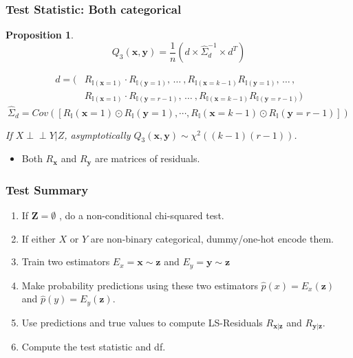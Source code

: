 \documentclass{beamer}
\def\ci{\perp\!\!\!\!\!\perp}
\newtheorem{proposition}{Proposition}
\begin{document}
\begin{frame}
	\frametitle{Test Statistic: Both categorical}
	\begin{proposition}

	$$ Q_3(\bm{x}, \bm{y}) = \frac{1}{n} (d \times \hat{\Sigma}_d^{-1} \times d^T) $$

	\begin{equation*}
		\begin{split}
		d = (&R_{\mathbb{I}(\mathbf{x}=1)} \cdot R_{\mathbb{I}(\mathbf{y}=1)}, \, \ldots \ ,
				R_{\mathbb{I}(\mathbf{x}=k-1)} R_{\mathbb{I}(\mathbf{y}=1)}, \, \ldots \, , \\
		     &R_{\mathbb{I}(\mathbf{x}=1)} \cdot R_{\mathbb{I}(\mathbf{y}=r-1)}, \, \ldots \ ,
				R_{\mathbb{I}(\mathbf{x}=k-1)} R_{\mathbb{I}(\mathbf{y}=r-1)}) 
		\end{split}
	\end{equation*}
	\begin{equation*}
		\hat{\Sigma}_d = Cov([R_\mathbb{I}(\mathbf{x}=1) \odot R_\mathbb{I}(\mathbf{y}=1), \cdots, R_\mathbb{I}(\mathbf{x}=k-1) \odot R_\mathbb{I}(\mathbf{y}=r-1)])
	\end{equation*}

	If $ X \ci Y | Z $, asymptotically $ Q_3(\bm{x}, \bm{y}) \sim \chi^2((k-1)(r-1)) $.
	\end{proposition}
	\begin{center}
		\begin{itemize}
			\item Both $ R_{\bm{x}} $ and $ R_{\bm{y}} $ are matrices of residuals.
		\end{itemize}
	\end{center}

\end{frame}

\begin{frame}
	\frametitle{Test Summary}
	\begin{enumerate}
		\setlength\itemsep{1em}
		\item If $\mathbf{Z} = \emptyset $ , do a non-conditional chi-squared test.
		\item If either $ X $ or $ Y $ are non-binary categorical,
			dummy/one-hot encode them.
		\item Train two estimators $ E_x = \bm{x} \sim \bm{z} $ and
			$ E_y = \bm{y} \sim \bm{z} $
		\item Make probability predictions using these two estimators 
			$ \hat{p}(x) = E_x(\bm{z}) $ and $ \hat{p}(y) =
			E_y(\bm{\bm{z}}) $.
		\item Use predictions and true values to compute LS-Residuals $ R_{\bm{x}|\bm{z}} $ and $ R_{\bm{y}|\bm{z}} $.	
		\item Compute the test statistic and df.
	\end{enumerate}
\end{frame}
\end{document}
